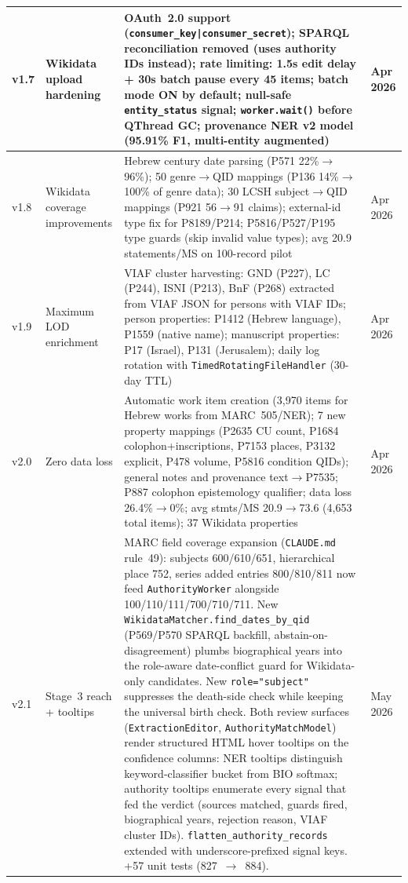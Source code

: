 \documentclass[12pt]{article}
\newcommand{\filepath}[1]{\texttt{\small #1}}
\newcommand{\code}[1]{\texttt{#1}}
\begin{document}
\begin{longtable}{|l|l|p{5cm}|l|}
\hline
v1.7 & Wikidata upload hardening & OAuth~2.0 support (\code{consumer\_key|consumer\_secret}); SPARQL reconciliation removed (uses authority IDs instead); rate limiting: 1.5s edit delay + 30s batch pause every 45 items; batch mode ON by default; null-safe \code{entity\_status} signal; \code{worker.wait()} before QThread GC; provenance NER v2 model (95.91\% F1, multi-entity augmented) & Apr 2026 \\
\hline
v1.8 & Wikidata coverage improvements & Hebrew century date parsing (P571 22\%$\to$96\%); 50 genre$\to$QID mappings (P136 14\%$\to$100\% of genre data); 30 LCSH subject$\to$QID mappings (P921 56$\to$91 claims); external-id type fix for P8189/P214; P5816/P527/P195 type guards (skip invalid value types); avg 20.9 statements/MS on 100-record pilot & Apr 2026 \\
\hline
v1.9 & Maximum LOD enrichment & VIAF cluster harvesting: GND (P227), LC (P244), ISNI (P213), BnF (P268) extracted from VIAF JSON for persons with VIAF IDs; person properties: P1412 (Hebrew language), P1559 (native name); manuscript properties: P17 (Israel), P131 (Jerusalem); daily log rotation with \code{TimedRotatingFileHandler} (30-day TTL) & Apr 2026 \\
\hline
v2.0 & Zero data loss & Automatic work item creation (3,970 items for Hebrew works from MARC~505/NER); 7 new property mappings (P2635 CU count, P1684 colophon+inscriptions, P7153 places, P3132 explicit, P478 volume, P5816 condition QIDs); general notes and provenance text$\to$P7535; P887 colophon epistemology qualifier; data loss 26.4\%$\to$0\%; avg stmts/MS 20.9$\to$73.6 (4,653 total items); 37 Wikidata properties & Apr 2026 \\
\hline
v2.1 & Stage~3 reach + tooltips & MARC field coverage expansion (\filepath{CLAUDE.md} rule~49): subjects 600/610/651, hierarchical place 752, series added entries 800/810/811 now feed \code{AuthorityWorker} alongside 100/110/111/700/710/711. New \code{WikidataMatcher.find\_dates\_by\_qid} (P569/P570 SPARQL backfill, abstain-on-disagreement) plumbs biographical years into the role-aware date-conflict guard for Wikidata-only candidates. New \code{role="subject"} suppresses the death-side check while keeping the universal birth check. Both review surfaces (\code{ExtractionEditor}, \code{AuthorityMatchModel}) render structured HTML hover tooltips on the confidence columns: NER tooltips distinguish keyword-classifier bucket from BIO softmax; authority tooltips enumerate every signal that fed the verdict (sources matched, guards fired, biographical years, rejection reason, VIAF cluster IDs). \code{flatten\_authority\_records} extended with underscore-prefixed signal keys. +57 unit tests (827~$\to$~884). & May 2026 \\

\end{longtable}
\end{document}

